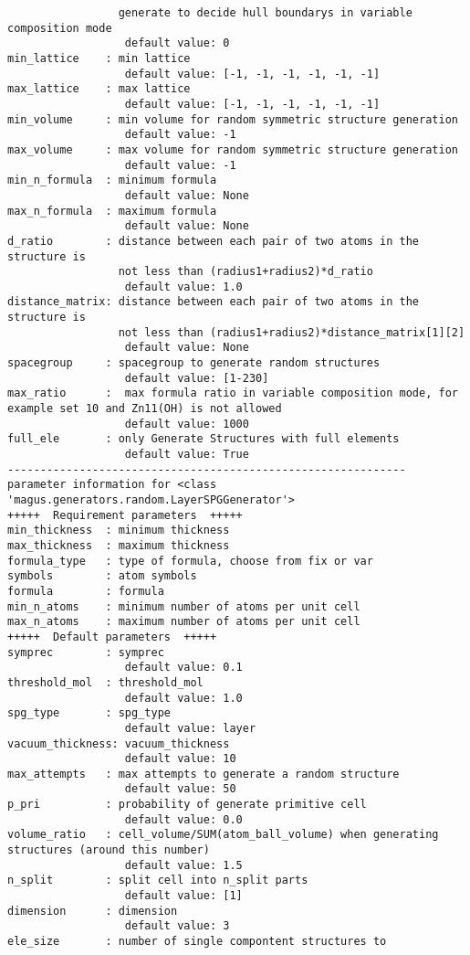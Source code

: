 \documentclass[12pt,oneside]{book}
\begin{document}
\begin{tcolorbox}
\begin{verbatim}
                 generate to decide hull boundarys in variable composition mode
                  default value: 0
min_lattice    : min lattice
                  default value: [-1, -1, -1, -1, -1, -1]
max_lattice    : max lattice
                  default value: [-1, -1, -1, -1, -1, -1]
min_volume     : min volume for random symmetric structure generation 
                  default value: -1
max_volume     : max volume for random symmetric structure generation
                  default value: -1
min_n_formula  : minimum formula
                  default value: None
max_n_formula  : maximum formula
                  default value: None
d_ratio        : distance between each pair of two atoms in the structure is
                 not less than (radius1+radius2)*d_ratio
                  default value: 1.0
distance_matrix: distance between each pair of two atoms in the structure is
                 not less than (radius1+radius2)*distance_matrix[1][2]
                  default value: None
spacegroup     : spacegroup to generate random structures
                  default value: [1-230]
max_ratio      :  max formula ratio in variable composition mode, for example set 10 and Zn11(OH) is not allowed
                  default value: 1000
full_ele       : only Generate Structures with full elements
                  default value: True
-------------------------------------------------------------
parameter information for <class 'magus.generators.random.LayerSPGGenerator'>
+++++  Requirement parameters  +++++
min_thickness  : minimum thickness
max_thickness  : maximum thickness
formula_type   : type of formula, choose from fix or var
symbols        : atom symbols
formula        : formula
min_n_atoms    : minimum number of atoms per unit cell
max_n_atoms    : maximum number of atoms per unit cell
+++++  Default parameters  +++++
symprec        : symprec
                  default value: 0.1
threshold_mol  : threshold_mol
                  default value: 1.0
spg_type       : spg_type
                  default value: layer
vacuum_thickness: vacuum_thickness
                  default value: 10
max_attempts   : max attempts to generate a random structure
                  default value: 50
p_pri          : probability of generate primitive cell
                  default value: 0.0
volume_ratio   : cell_volume/SUM(atom_ball_volume) when generating structures (around this number)
                  default value: 1.5
n_split        : split cell into n_split parts
                  default value: [1]
dimension      : dimension
                  default value: 3
ele_size       : number of single compontent structures to

\end{verbatim}
\end{tcolorbox}
\end{document}
